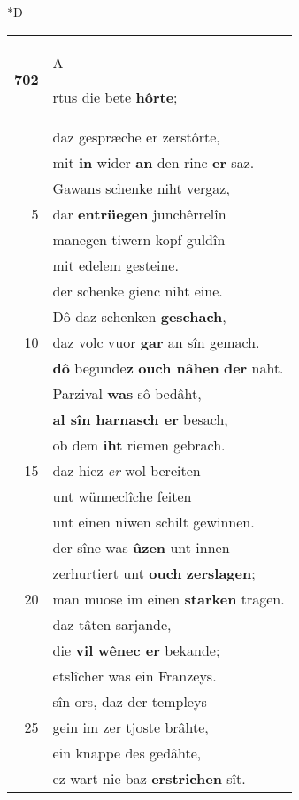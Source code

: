\documentclass[8pt,a4paper,notitlepage]{article}
\begin{document}
\begin{table}[ht]
\begin{minipage}[t]{0.5\linewidth}
\small
\begin{center}*D
\end{center}
\begin{tabular}{rl}
\textbf{702} & \begin{large}A\end{large}rtus die bete \textbf{hôrte};\\ 
 & daz gespræche er zerstôrte,\\ 
 & mit \textbf{in} wider \textbf{an} den rinc \textbf{er} saz.\\ 
 & Gawans schenke niht vergaz,\\ 
5 & dar \textbf{en}\textbf{trüegen} junchêrrelîn\\ 
 & manegen tiwern kopf guldîn\\ 
 & mit edelem gesteine.\\ 
 & der schenke gienc niht eine.\\ 
 & Dô daz schenken \textbf{geschach},\\ 
10 & daz volc vuor \textbf{gar} an sîn gemach.\\ 
 & \textbf{dô} begunde\textbf{z} \textbf{ouch nâhen} \textbf{der} naht.\\ 
 & Parzival \textbf{was} sô bedâht,\\ 
 & \textbf{al sîn harnasch er} besach,\\ 
 & ob dem \textbf{iht} riemen gebrach.\\ 
15 & daz hiez \textit{er} wol bereiten\\ 
 & unt wünneclîche feiten\\ 
 & unt einen niwen schilt gewinnen.\\ 
 & der sîne was \textbf{ûzen} unt innen\\ 
 & zerhurtiert unt \textbf{ouch} \textbf{zerslagen};\\ 
20 & man muose im einen \textbf{starken} tragen.\\ 
 & daz tâten sarjande,\\ 
 & die \textbf{vil} \textbf{wênec er} bekande;\\ 
 & etslîcher was ein Franzeys.\\ 
 & sîn ors, daz der templeys\\ 
25 & gein im zer tjoste brâhte,\\ 
 & ein knappe des gedâhte,\\ 
 & ez wart nie baz \textbf{erstrichen} sît.\\ 

\end{tabular}
\end{minipage}
\end{table}
\end{document}
